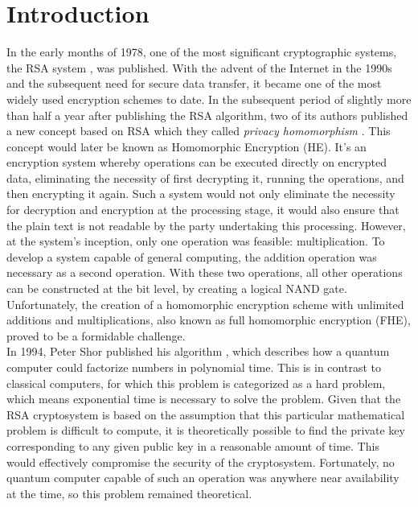 \chapter{Introduction}
\label{Introduction}


In the early months of 1978, one of the most significant cryptographic systems, the RSA system \cite{RSA}, was published. With the advent of the Internet in the 1990s and the subsequent need for secure data transfer, it became one of the most widely used encryption schemes to date. In the subsequent period of slightly more than half a year after publishing the RSA algorithm, two of its authors published a new concept based on RSA which they called \textit{privacy homomorphism} \cite{Rivest1978}. This concept would later be known as Homomorphic Encryption (HE). It's an encryption system whereby operations can be executed directly on encrypted data, eliminating the necessity of first decrypting it, running the operations, and then encrypting it again. Such a system would not only eliminate the necessity for decryption and encryption at the processing stage, it would also ensure that the plain text is not readable by the party undertaking this processing. However, at the system's inception, only one operation was feasible: multiplication. To develop a system capable of general computing, the addition operation was necessary as a second operation. With these two operations, all other operations can be constructed at the bit level, by creating a logical NAND gate. Unfortunately, the creation of a homomorphic encryption scheme with unlimited additions and multiplications, also known as full homomorphic encryption (FHE), proved to be a formidable challenge.\\
In 1994, Peter Shor published his algorithm \cite{Shor}, which describes how a quantum computer could factorize numbers in polynomial time. This is in contrast to classical computers, for which this problem is categorized as a hard problem, which means exponential time is necessary to solve the problem. Given that the RSA cryptosystem is based on the assumption that this particular mathematical problem is difficult to compute, it is theoretically possible to find the private key corresponding to any given public key in a reasonable amount of time. This would effectively compromise the security of the cryptosystem. Fortunately, no quantum computer capable of such an operation was anywhere near availability at the time, so this problem remained theoretical.\\

